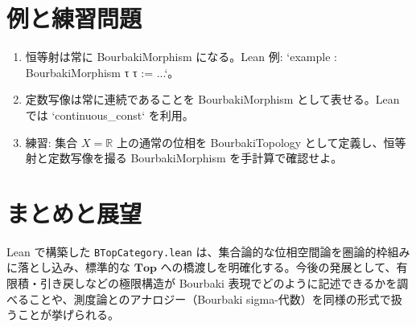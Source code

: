 \documentclass[a4paper]{ltjsarticle}
\begin{document}
\section{例と練習問題}
\begin{enumerate}
  \item 恒等射は常に BourbakiMorphism になる。Lean 例: `example : BourbakiMorphism τ τ := ...`。
  \item 定数写像は常に連続であることを BourbakiMorphism として表せる。Lean では `continuous_const` を利用。
  \item 練習: 集合 $X=\mathbb{R}$ 上の通常の位相を BourbakiTopology として定義し、恒等射と定数写像を撮る BourbakiMorphism を手計算で確認せよ。
\end{enumerate}

\section{まとめと展望}
Lean で構築した \texttt{BTopCategory.lean} は、集合論的な位相空間論を圏論的枠組みに落とし込み、標準的な $\mathbf{Top}$ への橋渡しを明確化する。今後の発展として、有限積・引き戻しなどの極限構造が Bourbaki 表現でどのように記述できるかを調べることや、測度論とのアナロジー（Bourbaki sigma-代数）を同様の形式で扱うことが挙げられる。
\end{document}

